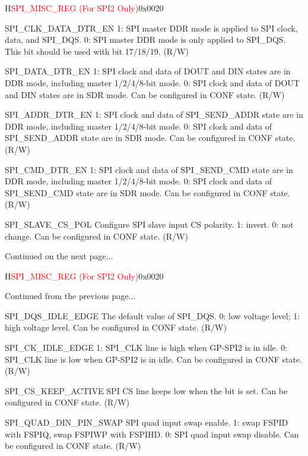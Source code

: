 \begin{register}{H}{\textcolor{red}{SPI\_MISC\_REG (For SPI2 Only)}}{0x{}0020}
\begin{regdesc}
\begin{reglist}
\label{fielddesc:SPICLKDATADTREN}\item [SPI\_CLK\_DATA\_DTR\_EN] 1: SPI master DDR mode is applied to SPI clock, data, and SPI\_DQS. 0: SPI master DDR mode is only applied to SPI\_DQS. This bit should be used with bit 17/18/19. (R/W)
\label{fielddesc:SPIDATADTREN}\item [SPI\_DATA\_DTR\_EN] 1: SPI clock and data of DOUT and DIN states are in DDR mode, including master 1/2/4/8-bit mode. 0: SPI clock and data of DOUT and DIN states are in SDR mode. Can be configured in CONF state. (R/W)
\label{fielddesc:SPIADDRDTREN}\item [SPI\_ADDR\_DTR\_EN] 1: SPI clock and data of SPI\_SEND\_ADDR state are in DDR mode, including master 1/2/4/8-bit mode. 0: SPI clock and data of SPI\_SEND\_ADDR state are in SDR mode. Can be configured in CONF state. (R/W)
\label{fielddesc:SPICMDDTREN}\item [SPI\_CMD\_DTR\_EN] 1: SPI clock and data of SPI\_SEND\_CMD state are in DDR mode, including master 1/2/4/8-bit mode. 0: SPI clock and data of SPI\_SEND\_CMD state are in SDR mode. Can be configured in CONF state. (R/W)
\label{fielddesc:SPISLAVECSPOL}\item [SPI\_SLAVE\_CS\_POL] Configure SPI slave input CS polarity. 1: invert. 0: not change. Can be configured in CONF state. (R/W)
\item [Continued on the next page...]
\end{reglist}\end{regdesc}
\end{register}

\addtocounter{Regfloat}{-1}
\begin{register}{H}{\textcolor{red}{SPI\_MISC\_REG (For SPI2 Only)}}{0x{}0020}
\begin{regdesc}\begin{reglist}
\item [Continued from the previous page...]

\label{fielddesc:SPIDQSIDLEEDGE}\item [SPI\_DQS\_IDLE\_EDGE] The default value of SPI\_DQS. 0: low voltage level; 1: high voltage level. Can be configured in CONF state. (R/W)
\label{fielddesc:SPICKIDLEEDGE}\item [SPI\_CK\_IDLE\_EDGE] 1: SPI\_CLK line is high when GP-SPI2 is in idle. 0: SPI\_CLK line is low when GP-SPI2 is in idle. Can be configured in CONF state. (R/W)
\label{fielddesc:SPICSKEEPACTIVE}\item [SPI\_CS\_KEEP\_ACTIVE] SPI CS line keeps low when the bit is set. Can be configured in CONF state. (R/W)
\label{fielddesc:SPIQUADDINPINSWAP}\item [SPI\_QUAD\_DIN\_PIN\_SWAP] SPI quad input swap enable. 1: swap FSPID with FSPIQ, swap FSPIWP with FSPIHD. 0: SPI quad input swap disable. Can be configured in CONF state. (R/W)
\end{reglist}\end{regdesc}
\end{register}


